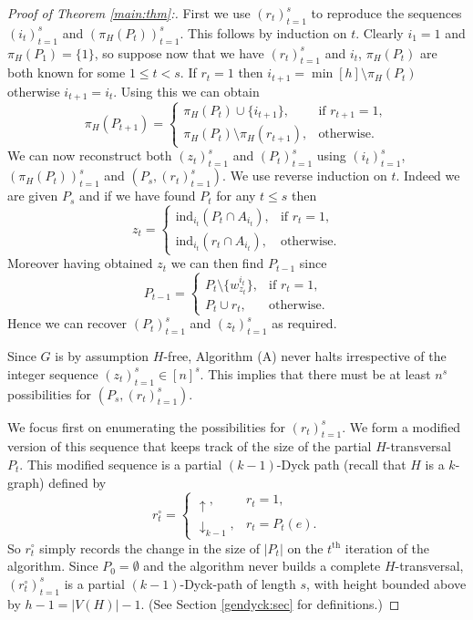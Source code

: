 \documentclass[12]{article}
\def\tr{\textrm}
\def\ind{\mathrm{ind}}
\def\dycku{\uparrow}
\def\dyckk{\downarrow_{k-1}}
\begin{document}
\begin{proof}[Proof of Theorem \ref{main:thm}:]
First we use $(r_t)_{t=1}^s$ to reproduce the sequences $(i_t)_{t=1}^s$ and $(\pi_H(P_t))_{t=1}^s$. This follows by induction on $t$. Clearly $i_1=1$ and $\pi_H(P_1)=\{1\}$, so suppose now  that we have $(r_t)_{t=1}^s$ and $i_{t}$,  $\pi_H(P_t)$ are both known for some $1\leq t<s$. If $r_t=1$ then $i_{t+1}=\min[h]\setminus \pi_H(P_t)$ otherwise $i_{t+1}=i_t$. Using this we can obtain
\[
\pi_H(P_{t+1})=\left\{
\begin{array}{ll}
\pi_H(P_t)\cup \{i_{t+1}\},& \textrm{if }r_{t+1}=1,\\
\pi_H(P_t)\setminus \pi_H(r_{t+1}),&\textrm{otherwise.}
\end{array}\right.\]
We can now reconstruct both $(z_t)_{t=1}^s$ and $(P_t)_{t=1}^s$ using  $(i_t)_{t=1}^s$, $(\pi_H(P_t))_{t=1}^s$ and $(P_s,(r_t)_{t=1}^s)$. We use reverse induction on $t$.
Indeed we are given $P_s$ and if we have found $P_t$ for any  $t\leq s$ then 
\[
z_t=\left\{
\begin{array}{ll}
\ind_{i_t}(P_t\cap A_{i_t}),& \textrm{if }r_{t}=1,\\
\ind_{i_t}(r_t \cap A_{i_t}),&\textrm{otherwise.}
\end{array}\right.\]
Moreover having obtained $z_t$ we can then find $P_{t-1}$ since
\[
P_{t-1}=\left\{
\begin{array}{ll}
P_t\setminus \{w_{z_t}^{i_t}\},& \textrm{if }r_{t}=1,\\
P_t\cup r_t,&\textrm{otherwise.}
\end{array}\right.\]
Hence we can recover $(P_t)_{t=1}^s$ and $(z_t)_{t=1}^s$ as required.

Since $G$ is by assumption $H$-free, Algorithm (A) never halts irrespective of the integer sequence $(z_t)_{t=1}^s\in[n]^s$. This implies that there must be at least $n^s$ possibilities for $(P_s,(r_t)_{t=1}^s)$. 

We focus first on enumerating the possibilities for $(r_t)_{t=1}^s$. We form a modified version of this sequence that keeps track of the size of the partial $H$-transversal $P_t$. This modified sequence is a partial $(k-1)$-Dyck path (recall that $H$ is a $k$-graph) defined by \[
r^\circ_t=\left\{
\begin{array}{ll}
  \dycku,& r_t=1,\\
  \dyckk,& r_t=P_t(e). \end{array}\right.\] So $r_t^\circ$ simply records the change in the size of $|P_t|$ on the $t^\tr{th}$ iteration of the algorithm. Since $P_0=\emptyset$ and the algorithm never builds a complete $H$-transversal, $(r_t^\circ)_{t=1}^s$ is a partial $(k-1)$-Dyck-path of length $s$, with height bounded above by $h-1=|V(H)|-1$. (See Section \ref{gendyck:sec} for definitions.)


\end{proof}
\end{document}
